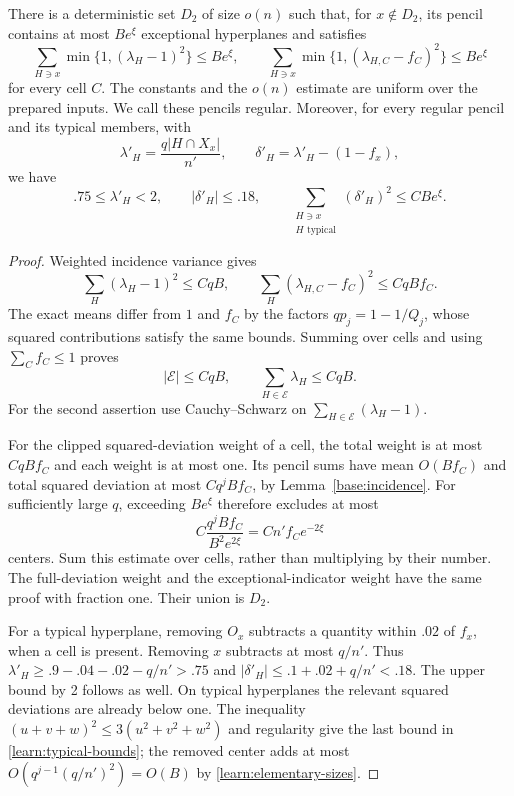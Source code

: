 \begin{lemma}\label{learn:regular-pencils}
There is a deterministic set $D_2$ of size $o(n)$ such that, for
$x\notin D_2$, its pencil contains at most $Be^\xi$ exceptional
hyperplanes and satisfies
\[
 \sum_{H\ni x}\min\{1,(\lambda_H-1)^2\}\le Be^\xi,
 \qquad
 \sum_{H\ni x}\min\{1,(\lambda_{H,C}-f_C)^2\}\le Be^\xi
\]
for every cell $C$. The constants and the $o(n)$ estimate are uniform
over the prepared inputs. We call these pencils regular.
Moreover, for every regular pencil and its typical members, with
\begin{equation}\label{learn:outside-mass}
 \lambda'_H=\frac{q|H\cap X_x|}{n'},\qquad
 \delta'_H=\lambda'_H-(1-f_x),
\end{equation}
we have
\begin{equation}\label{learn:typical-bounds}
 .75\le\lambda'_H<2,\qquad |\delta'_H|\le .18,\qquad
 \sum_{\substack{H\ni x\\H\text{ typical}}}(\delta'_H)^2
 \le CBe^\xi.
\end{equation}
\end{lemma}

\begin{proof}
Weighted incidence variance gives
\begin{equation}\label{learn:total-variance}
 \sum_H(\lambda_H-1)^2\le CqB,\qquad
 \sum_H(\lambda_{H,C}-f_C)^2\le CqBf_C.
\end{equation}
The exact means differ from $1$ and $f_C$ by the factors
$qp_j=1-1/Q_j$, whose squared contributions satisfy the same bounds.
Summing over cells and using $\sum_C f_C\le1$ proves
\begin{equation}\label{learn:exceptional-size}
 |\mathcal E|\le CqB,\qquad
 \sum_{H\in\mathcal E}\lambda_H\le CqB.
\end{equation}
For the second assertion use Cauchy--Schwarz on
$\sum_{H\in\mathcal E}(\lambda_H-1)$.

For the clipped squared-deviation weight of a cell, the total weight is
at most $CqBf_C$ and each weight is at most one. Its pencil sums have
mean $O(Bf_C)$ and total squared deviation at most $Cq^jBf_C$, by
Lemma~\ref{base:incidence}. For sufficiently large $q$, exceeding
$Be^\xi$ therefore excludes at most
\[
 C\frac{q^jBf_C}{B^2e^{2\xi}}=Cn'f_Ce^{-2\xi}
\]
centers. Sum this estimate over cells, rather than multiplying by their
number. The full-deviation weight and the exceptional-indicator weight
have the same proof with fraction one. Their union is $D_2$.

For a typical hyperplane, removing $O_x$ subtracts a quantity within
$.02$ of $f_x$, when a cell is present. Removing $x$ subtracts at most
$q/n'$. Thus $\lambda'_H\ge .9-.04-.02-q/n'>.75$ and
$|\delta'_H|\le .1+.02+q/n'<.18$. The upper bound by 2 follows as well.
On typical hyperplanes the relevant squared deviations are already
below one. The inequality $(u+v+w)^2\le3(u^2+v^2+w^2)$ and regularity
give the last bound in \eqref{learn:typical-bounds}; the removed center
adds at most
$O(q^{j-1}(q/n')^2)=O(B)$ by \eqref{learn:elementary-sizes}.
\end{proof}


